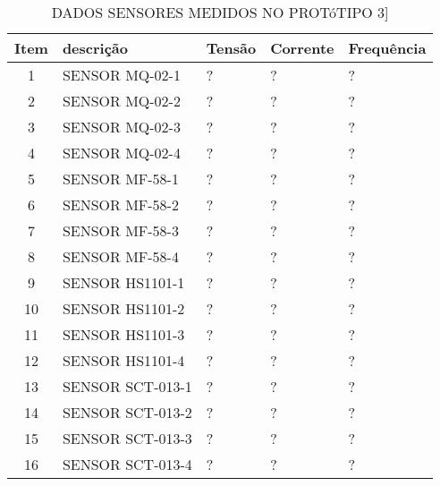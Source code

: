 \begin{table}
	\centering
	\caption{DADOS SENSORES MEDIDOS NO PROTóTIPO 3]}
	\begin{tabular}{ |c | p{3cm}| p{3cm} |p{3cm} | p{3cm} | } \hline
		\textbf{ Item} 	   & \textbf{descrição}	&\textbf{Tensão} &\textbf{Corrente} &\textbf{Frequência} \\ \hline
		1  & SENSOR MQ-02-1 & ? & ? & ? \\ \hline
		2  & SENSOR MQ-02-2 & ? & ? & ? \\ \hline
		3  & SENSOR MQ-02-3 & ? & ? & ? \\ \hline
		4  & SENSOR MQ-02-4 & ? & ? & ? \\ \hline
		5  & SENSOR MF-58-1 & ? & ? & ?\\ \hline
		6  & SENSOR MF-58-2 & ? & ? & ?\\ \hline
		7  & SENSOR MF-58-3 & ? & ? & ?\\ \hline
		8  & SENSOR MF-58-4 & ? & ? & ?\\ \hline
		9  & SENSOR HS1101-1 & ? & ? & ?\\ \hline
		10  & SENSOR HS1101-2 & ? & ? & ?\\ \hline
		11 & SENSOR HS1101-3 & ? & ? & ?\\ \hline
		12 & SENSOR HS1101-4 & ? & ? & ?\\ \hline
		13 & SENSOR SCT-013-1& ? & ? & ?\\ \hline
		14 & SENSOR SCT-013-2& ? & ? & ?\\ \hline
		15 & SENSOR SCT-013-3& ? & ? & ?\\ \hline
		16 & SENSOR SCT-013-4& ? & ? & ?\\ \hline
		
		
	\end{tabular}					
	
	
	\label{T15}\par
\end{table}


